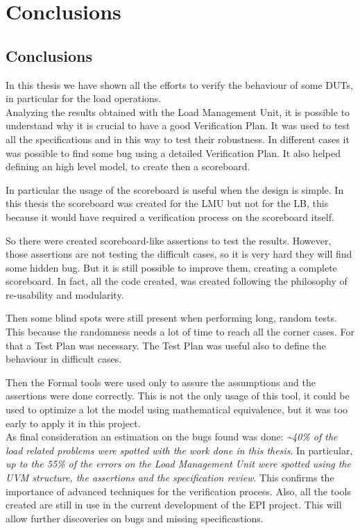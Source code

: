 \chapter{Conclusions}
\section{Conclusions}
In this thesis we have shown all the efforts to verify the behaviour of some DUTs, in particular for the load operations.\\

Analyzing the results obtained with the Load Management Unit, it is possible to understand why it is crucial to have a good Verification Plan. It was used to test all the specifications and in this way to test their robustness. In different cases it was possible to find some bug using a detailed Verification Plan. It also helped defining an high level model, to create then a scoreboard.

In particular the usage of the scoreboard is useful when the design is simple. In this thesis the scoreboard was created for the LMU but not for the LB, this because it would have required a verification process on the scoreboard itself.

So there were created scoreboard-like assertions to test the results. However, those assertions are not testing the difficult cases, so it is very hard they will find some hidden bug. 
But it is still possible to improve them, creating a complete scoreboard. In fact, all the code created, was created following the philosophy of re-usability and modularity.

Then some blind spots were still present when performing long, random tests. This because the randomness needs a lot of time to reach all the corner cases. For that a Test Plan was necessary.
The Test Plan was useful also to define the behaviour in difficult cases.

Then the Formal tools were used only to assure the assumptions and the assertions were done correctly. This is not the only usage of this tool, it could be used to optimize a lot the model using mathematical equivalence, but it was too early to apply it in this project.\\


As final consideration an estimation on the bugs found was done:
\emph{\textasciitilde 40\% of the load related problems were spotted with the work done in this thesis}. In particular, \emph{up to the 55\% of the errors on the Load Management Unit were spotted using the UVM structure, the assertions and the specification review}.
This confirms the importance of advanced techniques for the verification process. Also, all the tools created are still in use in the current development of the EPI project. This will allow further discoveries on bugs and missing specificastions.


